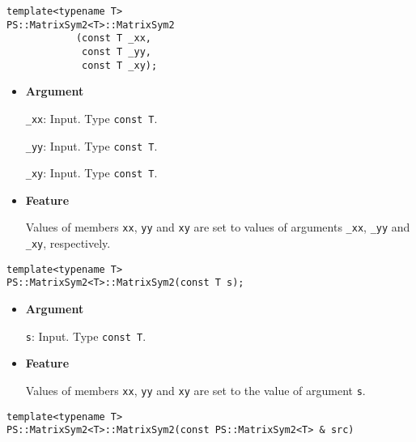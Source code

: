 \begin{screen}
\begin{verbatim}
template<typename T>
PS::MatrixSym2<T>::MatrixSym2
            (const T _xx,
             const T _yy,
             const T _xy);
\end{verbatim}
\end{screen}

\begin{itemize}

\item{{\bf Argument}}

\texttt{\_xx}: Input. Type \texttt{const T}.

\texttt{\_yy}: Input. Type \texttt{const T}.

\texttt{\_xy}: Input. Type \texttt{const T}.

\item{{\bf Feature}}

Values of members \texttt{xx}, \texttt{yy} and \texttt{xy} are set to values of arguments \texttt{\_xx}, \texttt{\_yy} and \texttt{\_xy}, respectively.

\end{itemize}

\begin{screen}
\begin{verbatim}
template<typename T>
PS::MatrixSym2<T>::MatrixSym2(const T s);
\end{verbatim}
\end{screen}

\begin{itemize}

\item{{\bf Argument}}

\texttt{s}: Input. Type \texttt{const T}.

\item{{\bf Feature}}

Values of members \texttt{xx}, \texttt{yy} and \texttt{xy} are set to the value of argument \texttt{s}.

\end{itemize}


\begin{screen}
\begin{verbatim}
template<typename T>
PS::MatrixSym2<T>::MatrixSym2(const PS::MatrixSym2<T> & src)
\end{verbatim}
\end{screen}

